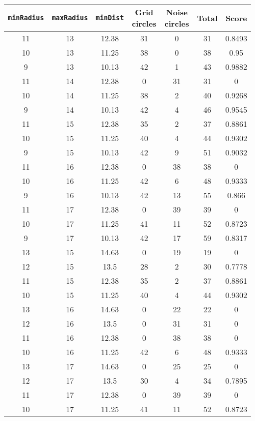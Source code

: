 \documentclass[letterpaper, 12pt]{article}
\begin{document}
\begin{longtable}{|c|c|c|c|c|c|c|}
\hline
\textbf{\texttt{minRadius}} & \textbf{\texttt{maxRadius}} & \textbf{\texttt{minDist}} & \textbf{Grid circles} & \textbf{Noise circles} & \textbf{Total} & \textbf{Score} \\
\hline
11 & 13 & 12.38 & 31 & 0 & 31 & 0.8493 \\
\hline
10 & 13 & 11.25 & 38 & 0 & 38 & 0.95 \\
\hline
9 & 13 & 10.13 & 42 & 1 & 43 & 0.9882 \\
\hline
11 & 14 & 12.38 & 0 & 31 & 31 & 0 \\
\hline
10 & 14 & 11.25 & 38 & 2 & 40 & 0.9268 \\
\hline
9 & 14 & 10.13 & 42 & 4 & 46 & 0.9545 \\
\hline
11 & 15 & 12.38 & 35 & 2 & 37 & 0.8861 \\
\hline
10 & 15 & 11.25 & 40 & 4 & 44 & 0.9302 \\
\hline
9 & 15 & 10.13 & 42 & 9 & 51 & 0.9032 \\
\hline
11 & 16 & 12.38 & 0 & 38 & 38 & 0 \\
\hline
10 & 16 & 11.25 & 42 & 6 & 48 & 0.9333 \\
\hline
9 & 16 & 10.13 & 42 & 13 & 55 & 0.866 \\
\hline
11 & 17 & 12.38 & 0 & 39 & 39 & 0 \\
\hline
10 & 17 & 11.25 & 41 & 11 & 52 & 0.8723 \\
\hline
9 & 17 & 10.13 & 42 & 17 & 59 & 0.8317 \\
\hline
13 & 15 & 14.63 & 0 & 19 & 19 & 0 \\
\hline
12 & 15 & 13.5 & 28 & 2 & 30 & 0.7778 \\
\hline
11 & 15 & 12.38 & 35 & 2 & 37 & 0.8861 \\
\hline
10 & 15 & 11.25 & 40 & 4 & 44 & 0.9302 \\
\hline
13 & 16 & 14.63 & 0 & 22 & 22 & 0 \\
\hline
12 & 16 & 13.5 & 0 & 31 & 31 & 0 \\
\hline
11 & 16 & 12.38 & 0 & 38 & 38 & 0 \\
\hline
10 & 16 & 11.25 & 42 & 6 & 48 & 0.9333 \\
\hline
13 & 17 & 14.63 & 0 & 25 & 25 & 0 \\
\hline
12 & 17 & 13.5 & 30 & 4 & 34 & 0.7895 \\
\hline
11 & 17 & 12.38 & 0 & 39 & 39 & 0 \\
\hline
10 & 17 & 11.25 & 41 & 11 & 52 & 0.8723 \\

\end{longtable}
\end{document}
